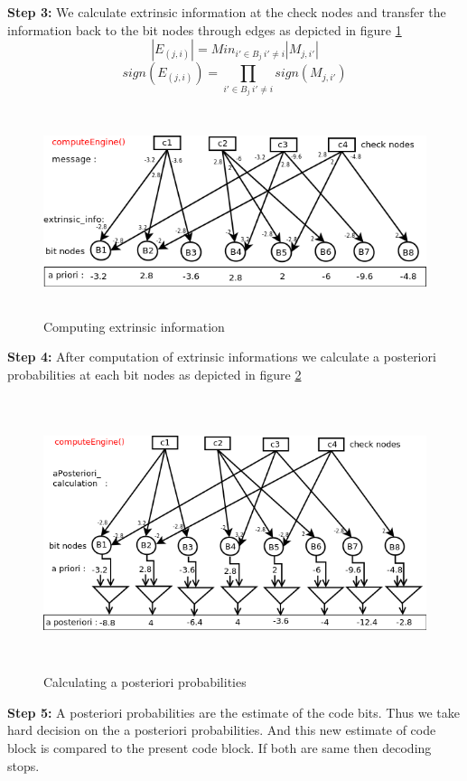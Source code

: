 \textbf{Step 3:}
We calculate extrinsic information at the check nodes and transfer the information back to the bit nodes through edges as depicted in figure \ref{minSum4}
 \[ |E_{(j,i)}| =  Min_{i'\in B_j \ i'\neq i }|M_{j,i'}|   \] 
 \[ sign({E_{(j,i)}}) =  \prod_{i'\in B_j \ i'\neq i }sign(M_{j,i'})   \]
\begin{figure}[h!]
\centering
\includegraphics[height=6cm,width=12cm]{minSum4}
\caption[Computation of extrinsic information]{Computing extrinsic information}
\label{minSum4}
\end{figure}

\textbf{Step 4:}
After computation of extrinsic informations we calculate a posteriori probabilities at each bit nodes as depicted in figure \ref{minSum5}
\begin{figure}[h!]
\centering
\includegraphics[height=8cm,width=12cm]{minSum5}
\caption[Calculation of a posteriori probabilities]{Calculating a posteriori probabilities}
\label{minSum5}
\end{figure}

\textbf{Step 5:}
A posteriori probabilities are the estimate of the code bits. Thus we take hard decision on the a posteriori probabilities. And this new estimate of code block is compared to the present code block. If both are same  then decoding stops. 

